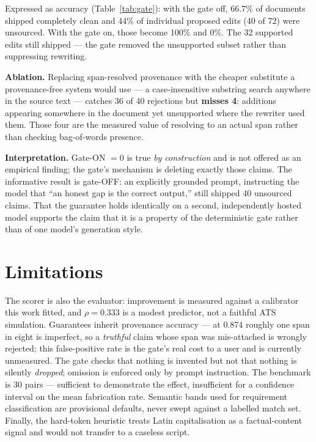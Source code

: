 \documentclass[conference]{IEEEtran}
\begin{document}
Expressed as accuracy (Table~\ref{tab:gate}): with the gate off, 66.7\% of
documents shipped completely clean and 44\% of individual proposed edits (40 of
72) were unsourced. With the gate on, those become 100\% and 0\%. The 32
supported edits still shipped --- the gate removed the unsupported subset rather
than suppressing rewriting.

\textbf{Ablation.} Replacing span-resolved provenance with the cheaper
substitute a provenance-free system would use --- a case-insensitive substring
search anywhere in the source text --- catches 36 of 40 rejections but
\textbf{misses 4}: additions appearing somewhere in the document yet unsupported
where the rewriter used them. Those four are the measured value of resolving to
an actual span rather than checking bag-of-words presence.

\textbf{Interpretation.} Gate-ON $=0$ is true \emph{by construction} and is not
offered as an empirical finding; the gate's mechanism is deleting exactly those
claims. The informative result is gate-OFF: an explicitly grounded prompt,
instructing the model that ``an honest gap is the correct output,'' still
shipped 40 unsourced claims. That the guarantee holds identically on a second,
independently hosted model supports the claim that it is a property of the
deterministic gate rather than of one model's generation style.

\section{Limitations}

The scorer is also the evaluator: improvement is measured against a calibrator
this work fitted, and $\rho = 0.333$ is a modest predictor, not a faithful ATS
simulation. Guarantees inherit provenance accuracy --- at 0.874 roughly one span
in eight is imperfect, so a \emph{truthful} claim whose span was mis-attached is
wrongly rejected; this false-positive rate is the gate's real cost to a user and
is currently unmeasured. The gate checks that nothing is invented but not that
nothing is silently \emph{dropped}; omission is enforced only by prompt
instruction. The benchmark is 30 pairs --- sufficient to demonstrate the effect,
insufficient for a confidence interval on the mean fabrication rate. Semantic
bands used for requirement classification are provisional defaults, never swept
against a labelled match set. Finally, the hard-token heuristic treats Latin
capitalisation as a factual-content signal and would not transfer to a caseless
script.
\end{document}
